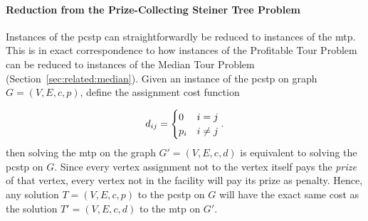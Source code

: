 \paragraph{Reduction from the Prize-Collecting Steiner Tree Problem}
Instances of the \gls{pcstp} can straightforwardly be reduced to instances of the \gls{mtp}. This is in exact correspondence to how instances
of the Profitable Tour Problem can be reduced to instances of the Median Tour Problem (Section~\ref{sec:related:median}).
Given an instance of the \gls{pcstp} on graph $G = (V, E, c, p)$, define the assignment cost function

$$d_{ij} =
 \begin{cases}
   0 & i = j \\
   p_i & i \neq j
 \end{cases}\mathnormal{.}
 $$
 then solving the \gls{mtp} on the graph $G' = (V, E, c, d)$ is equivalent to solving the \gls{pcstp} on $G$. Since every vertex assignment not
 to the vertex itself pays the \textit{prize} of that vertex, every vertex not in the facility will pay its prize as penalty. Hence,
 any solution $T = (V, E, c, p)$ to the \gls{pcstp} on $G$ will have the exact same cost as the solution $T' = (V, E, c, d)$ to the \gls{mtp} on $G'$.

